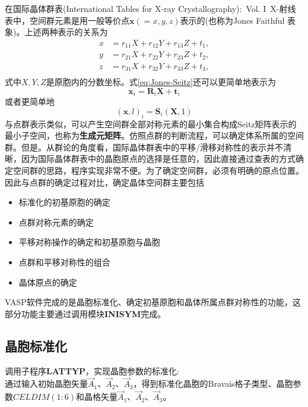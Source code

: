 \documentclass{article}      %
\newcommand{\upcite}[1]{\hspace{0ex}\textsuperscript{\cite{#1}}} %
\begin{document}
在国际晶体群表\textrm{(International Tables for X-ray Crystallography):~Vol. I~X-}射线表\upcite{Henry-Lonsdale_1972}中，空间群元素是用一般等价点$\mathbf{x}(=x,y,z)$表示的(也称为\textrm{Jones Faithful 表象})。上述两种表示的关系为
\begin{equation}
	\begin{aligned}
		x&=r_{11}X+r_{12}Y+r_{13}Z+t_1,\\
		y&=r_{21}X+r_{22}Y+r_{23}Z+t_2,\\
		z&=r_{31}X+r_{32}Y+r_{33}Z+t_3,\\
	\end{aligned}
	\label{eq:Jones-Seitz}
\end{equation}
式中$X,Y,Z$是原胞内的分数坐标。式\eqref{eq:Jones-Seitz}还可以更简单地表示为
\begin{equation}
	\mathbf{x}_i=\mathbf{R}_i\mathbf{X}+\mathbf{t}_i
	\label{eq:Jones-Seitz-1}
\end{equation}
或者更简单地
\begin{equation}
	(\mathbf{x},l)_i=\mathbf{S}_i(\mathbf{X},1)
	\label{eq:Jones-Seitz-2}
\end{equation}
与点群表示类似，可以产生空间群全部对称元素的最小集合构成\textrm{Seitz}矩阵表示的最小子空间，也称为\textbf{生成元矩阵}。仿照点群的判断流程，可以确定体系所属的空间群。但是。从群论的角度看，国际晶体群表\upcite{Henry-Lonsdale_1972}中的平移/滑移对称性的表示并不清晰，因为国际晶体群表中的晶胞原点的选择是任意的，因此直接通过查表的方式确定空间群的思路，程序实现非常不便。为了确定空间群，必须有明确的原点位置。因此与点群的确定过程对比，确定晶体空间群主要包括
\begin{itemize}
	\item 标准化的初基原胞的确定
	\item 点群对称元素的确定
	\item 平移对称操作的确定和初基原胞与晶胞
	\item 点群和平移对称性的组合
	\item 晶体原点的确定
\end{itemize}

\textrm{VASP}软件完成的是晶胞标准化、确定初基原胞和晶体所属点群对称性的功能，这部分功能主要通过调用模块\textbf{INISYM}完成。
\subsection{晶胞标准化}
调用子程序\textbf{LATTYP}，实现晶胞参数的标准化:~\\
通过输入初始晶胞矢量$\vec A_1$、$\vec A_2$、$\vec A_3$，得到标准化晶胞的\textrm{Bravais}格子类型、晶胞参数$\mathit{CELDIM}(1:6)$和晶格矢量$\vec A_1$、$\vec A_2$、$\vec A_3$。
\end{document}
